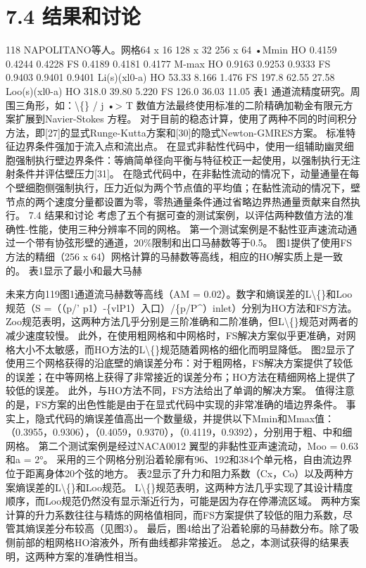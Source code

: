 \documentclass[UTF8,11pt,a4paper,openany,fontset=fandol]{ctexbook}
\begin{document}
\section{7.4 结果和讨论}
118 NAPOLITANO等人。网格64 x 16 128 x 32 256 x 64 •Mmin HO 0.4159 0.4244 0.4228 FS 0.4189 0.4181 0.4177 M-max HO 0.9163 0.9253 0.9333 FS 0.9403 0.9401 0.9401 Li(s)(xl0-a) HO 53.33 8.166 1.476 FS 197.8 62.55 27.58 Loo(s)(xl0-a) HO 318.0 39.80 5.220 FS 126.0 36.03 11.05 表1 通道流精度研究。周围三角形，如：\textbackslash\{\} / j •> T 数值方法最终使用标准的二阶精确加勒金有限元方案扩展到Navier-Stokes 方程。 对于目前的稳态计算，使用了两种不同的时间积分方法，即[27]的显式Runge-Kutta方案和[30]的隐式Newton-GMRES方案。 标准特征边界条件强加于流入点和流出点。 在显式非黏性代码中，使用一组辅助幽灵细胞强制执行壁边界条件：等熵简单径向平衡与特征校正一起使用，以强制执行无注射条件并评估壁压力[31]。 在隐式代码中，在非黏性流动的情况下，动量通量在每个壁细胞侧强制执行，压力近似为两个节点值的平均值；在黏性流动的情况下，壁节点的两个速度分量都设置为零，零热通量条件通过省略边界热通量贡献来自然执行。 7.4 结果和讨论 考虑了五个有据可查的测试案例，以评估两种数值方法的准确性-性能，使用三种分辨率不同的网格。 第一个测试案例是不黏性亚声速流动通过一个带有协弦形壁的通道，20\%限制和出口马赫数等于0.5。 图1提供了使用FS方法的精细（256 x 64）网格计算的马赫数等高线，相应的HO解实质上是一致的。 表1显示了最小和最大马赫

未来方向119图1通道流马赫数等高线（AM = 0.02）。数字和熵误差的L\textbackslash\{\}和Loo规范（S =（（p/' p1）-\{vlP1）入口）/\{p/P\textasciicircum{}）inlet）分别为HO方法和FS方法。 Zoo规范表明，这两种方法几乎分别是三阶准确和二阶准确，但L\textbackslash\{\}规范对两者的减少速度较慢。 此外，在使用粗网格和中网格时，FS解决方案似乎更准确，对网格大小不太敏感，而HO方法的L\textbackslash\{\}规范随着网格的细化而明显降低。 图2显示了使用三个网格获得的沿底壁的熵误差分布：对于粗网格，FS解决方案提供了较低的误差；在中等网格上获得了非常接近的误差分布；HO方法在精细网格上提供了较低的误差。 此外，与HO方法不同，FS方法给出了单调的解决方案。 值得注意的是，FS方案的出色性能是由于在显式代码中实现的非常准确的墙边界条件。 事实上，隐式代码的熵误差值高出一个数量级，并提供以下Mmin和Mmax值：（0.3955，0.9306），（0.4059，0.9370），（0.4119，0.9392），分别用于粗、中和细网格。 第二个测试案例是经过NACA0012 翼型的非黏性亚声速流动，Moo = 0.63和a = 2°。 采用的三个网格分别沿着轮廓有96、192和384个单元格，自由流边界位于距离身体20个弦的地方。 表2显示了升力和阻力系数（Cx，Co）以及两种方案熵误差的L\textbackslash\{\}和Loo规范。 L\textbackslash\{\}规范表明，这两种方法几乎实现了其设计精度顺序，而Loo规范仍然没有显示渐近行为，可能是因为存在停滞流区域。 两种方案计算的升力系数往往与精炼的网格值相同，而FS方案提供了较低的阻力系数，尽管其熵误差分布较高（见图3）。 最后，图4给出了沿着轮廓的马赫数分布。除了吸侧前部的粗网格HO溶液外，所有曲线都非常接近。 总之，本测试获得的结果表明，这两种方案的准确性相当。
\end{document}
